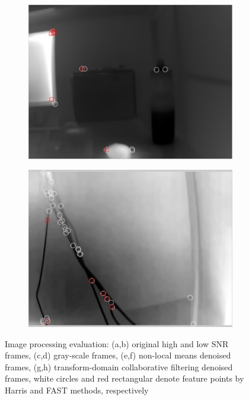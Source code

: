 \begin{figure}
\begin{subfigure}{0.49\columnwidth}
    \includegraphics[width=1.00\textwidth]{media/V_C_highsnrcornerstrans.jpg}
    	\caption{}
		\label{fig:imgprocessing_7}
  \end{subfigure}
	\begin{subfigure}{0.49\columnwidth}
    \centering
    \includegraphics[width=1.00\textwidth]{media/V_C_lowsnrcornerstrans.jpg}
		\caption{}
		\label{fig:imgprocessing_8}
  \end{subfigure}
\caption{Image processing evaluation: (a,b) original high and low SNR frames, (c,d) gray-scale frames, (e,f) non-local means denoised frames, (g,h)  transform-domain collaborative filtering denoised frames, white circles and red rectangular denote feature points by Harris and FAST methods, respectively}
\label{fig:imgprocessing}
\end{figure}



